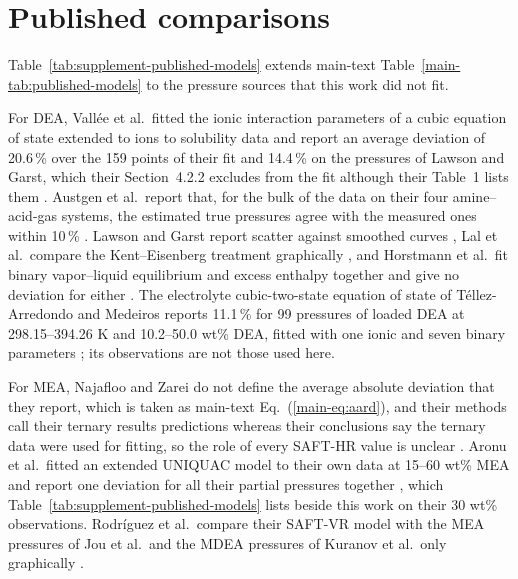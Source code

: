 \documentclass[a4paper,11pt]{article}
\begin{document}
\section{Published comparisons}\label{sec:s-published}
Table~\ref{tab:supplement-published-models} extends main-text Table~\ref{main-tab:published-models} to the pressure sources that this work did not fit.




For DEA, Vall\'ee et al.\ fitted the ionic interaction parameters of a cubic equation of state extended to ions to solubility data and report an average deviation of 20.6\,\% over the 159 points of their fit and 14.4\,\% on the pressures of Lawson and Garst, which their Section~4.2.2 excludes from the fit although their Table~1 lists them \cite{valleeRepresentationCO2H2S1999}.
Austgen et al.\ report that, for the bulk of the data on their four amine--acid-gas systems, the estimated true pressures agree with the measured ones within 10\,\% \cite{austgenModelVaporliquidEquilibria1989}.
Lawson and Garst report scatter against smoothed curves \cite{lawsonGasSweeteningData1976}, Lal et al.\ compare the Kent--Eisenberg treatment graphically \cite{lalSolubilityH2SCO21985}, and Horstmann et al.\ fit binary vapor--liquid equilibrium and excess enthalpy together and give no deviation for either \cite{horstmannPhaseEquilibriumExcess2002}.
The electrolyte cubic-two-state equation of state of T\'ellez-Arredondo and Medeiros reports 11.1\,\% for 99 pressures of loaded DEA at 298.15--394.26 K and 10.2--50.0 wt\% DEA, fitted with one ionic and seven binary parameters \cite{tellez-arredondoModelingCO2H2S2013}; its observations are not those used here.

For MEA, Najafloo and Zarei do not define the average absolute deviation that they report, which is taken as main-text Eq.~(\ref{main-eq:aard}), and their methods call their ternary results predictions whereas their conclusions say the ternary data were used for fitting, so the role of every SAFT-HR value is unclear \cite{Najafloo2018}.
Aronu et al.\ fitted an extended UNIQUAC model to their own data at 15--60 wt\% MEA and report one deviation for all their \COtwo partial pressures together \cite{Aronu2011}, which Table~\ref{tab:supplement-published-models} lists beside this work on their 30 wt\% observations.
Rodr\'iguez et al.\ compare their SAFT-VR model with the MEA pressures of Jou et al.\ and the MDEA pressures of Kuranov et al.\ only graphically \cite{Rodriguez2012}.
\end{document}
